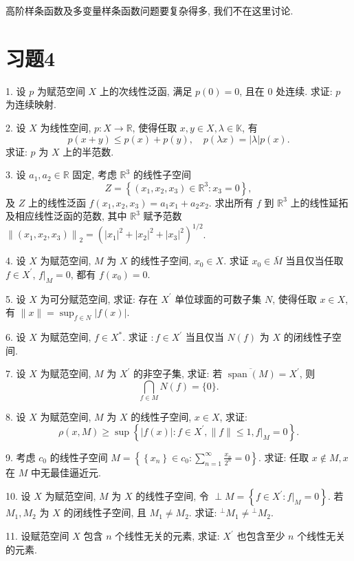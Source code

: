 \documentclass[openany]{ctexbook}
\theoremstyle{kaiti}
\theoremstyle{normal}
\begin{document}
高阶样条函数及多变量样条函数问题要复杂得多, 我们不在这里讨论.

\section*{习题4}

1. 设 $p$ 为赋范空间 $X$ 上的次线性泛函, 满足 $p(0)=0$, 且在 0 处连续. 求证: $p$ 为连续映射.

2. 设 $X$ 为线性空间, $p: X \rightarrow \mathbb{R}$, 使得任取 $x, y \in X, \lambda \in \mathbb{K}$, 有
$$
p(x+y) \leqslant p(x)+p(y), \quad p(\lambda x)=|\lambda| p(x).
$$
求证: $p$ 为 $X$ 上的半范数.

3. 设 $a_1, a_2 \in \mathbb{R}$ 固定, 考虑 $\mathbb{R}^3$ 的线性子空间
$$
Z=\left\{\left(x_1, x_2, x_3\right) \in \mathbb{R}^3: x_3=0\right\},
$$
及 $Z$ 上的线性泛函 $f\left(x_1, x_2, x_3\right)=a_1 x_1+a_2 x_2$. 求出所有 $f$ 到 $\mathbb{R}^3$ 上的线性延拓及相应线性泛函的范数, 其中 $\mathbb{R}^3$ 赋予范数 $\left\|\left(x_1, x_2, x_3\right)\right\|_2=\left(\left|x_1\right|^2+\left|x_2\right|^2+\left|x_3\right|^2\right)^{1 / 2}$.

4. 设 $X$ 为赋范空间, $M$ 为 $X$ 的线性子空间, $x_0 \in X$. 求证 $x_0 \in \bar{M}$ 当且仅当任取 $f \in X^{\prime}$, $\left.f\right|_{M}=0$, 都有 $f\left(x_0\right)=0$.

5. 设 $X$ 为可分赋范空间, 求证: 存在 $X^{\prime}$ 单位球面的可数子集 $N$, 使得任取 $x \in X$, 有 $\|x\|=\sup_{f \in N}|f(x)|$.

6. 设 $X$ 为赋范空间, $f \in X^{*}$. 求证 $: f \in X^{\prime}$ 当且仅当 $N(f)$ 为 $X$ 的闭线性子空间.

7. 设 $X$ 为赋范空间, $M$ 为 $X^{\prime}$ 的非空子集, 求证: 若 $\overline{\operatorname{span}(M)}=X^{\prime}$, 则
$$
\bigcap_{f \in M} N(f)=\{0\}.
$$

8. 设 $X$ 为赋范空间, $M$ 为 $X$ 的线性子空间, $x \in X$, 求证:
$$
\rho(x, M) \geqslant \sup\left\{|f(x)|: f \in X^{\prime},\|f\| \leqslant 1,\left.f\right|_{M}=0\right\}.
$$

9. 考虑 $c_0$ 的线性子空间 $M=\left\{\left\{x_n\right\} \in c_0: \sum_{n=1}^{\infty} \frac{x_n}{2^n}=0\right\}$. 求证: 任取 $x \notin M, x$ 在 $M$ 中无最佳逼近元.

10. 设 $X$ 为赋范空间, $M$ 为 $X$ 的线性子空间, 令 $\perp M=\left\{f \in X^{\prime}:\left.f\right|_{M}=0\right\}$. 若 $M_1, M_2$ 为 $X$ 的闭线性子空间, 且 $M_1 \neq M_2$. 求证: ${ }^{\perp} M_1 \neq{ }^{\perp} M_2$.

11. 设赋范空间 $X$ 包含 $n$ 个线性无关的元素, 求证: $X^{\prime}$ 也包含至少 $n$ 个线性无关的元素.
\end{document}
